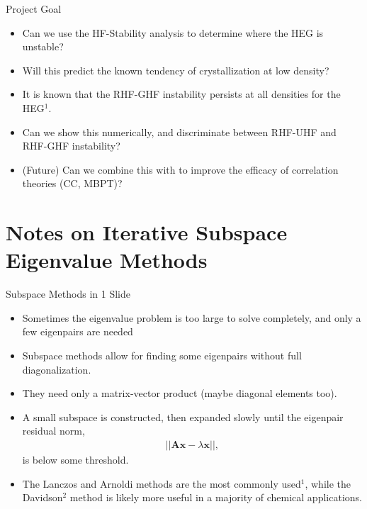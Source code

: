 \documentclass[10pt]{beamer}
\begin{document}
{{{{{{{{{%
\begin{frame}{Project Goal}
	\begin{itemize}[<+->]
		\item{Can we use the HF-Stability analysis to determine where the HEG is unstable?}
		\item{Will this predict the known tendency of crystallization at low density?}
		\item{It is known that the RHF-GHF instability persists at all densities for the HEG$^1$.}
		\item{Can we show this numerically, and discriminate between RHF-UHF and RHF-GHF instability?}
		\item{(Future) Can we combine this with to improve the efficacy of correlation theories (CC, MBPT)?}
	\end{itemize}
\end{frame}


\section{Notes on Iterative Subspace Eigenvalue Methods}
{%
\begin{frame}{Subspace Methods in 1 Slide}
	\begin{itemize}
		\item{Sometimes the eigenvalue problem is too large to solve completely, and only a few eigenpairs are needed}
		\item{Subspace methods allow for finding some eigenpairs without full diagonalization}.
		\item{They need only a matrix-vector product (maybe diagonal elements too).}
		\item{A small subspace is constructed, then expanded slowly until the eigenpair residual norm,
			\begin{eqnarray}
				||\mathbf{Ax} - \lambda \mathbf{x}||,
			\end{eqnarray}
		is below some threshold.
		}
		\item{The \alert{Lanczos} and \alert{Arnoldi} methods are the most commonly used$^1$, while the \alert{Davidson}$^2$ method is likely more useful in a majority of chemical applications. }
	\end{itemize}
\end{frame}

}}}}}}}}}}
\end{document}
